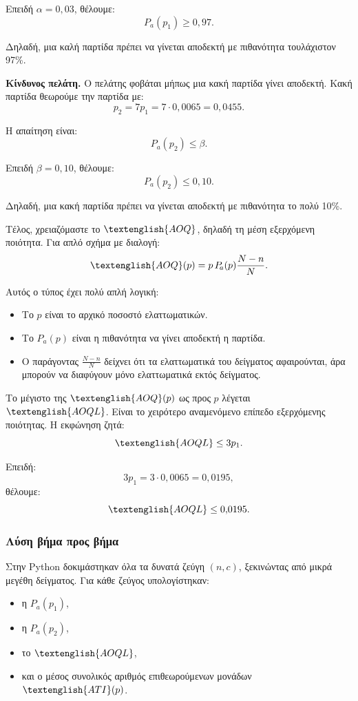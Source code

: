 \documentclass[12pt,a4paper]{article}
\newcommand{\Pa}{P_{\!a}}
\newcommand{\AOQ}{\textenglish{AOQ}}
\newcommand{\AOQL}{\textenglish{AOQL}}
\newcommand{\ATI}{\textenglish{ATI}}
\begin{document}
Επειδή \(\alpha=0{,}03\), θέλουμε:
\[
    \Pa(p_1)\ge 0{,}97.
\]

Δηλαδή, μια καλή παρτίδα πρέπει να γίνεται αποδεκτή με πιθανότητα τουλάχιστον
97\%.

\textbf{Κίνδυνος πελάτη.} Ο πελάτης φοβάται μήπως μια κακή παρτίδα γίνει
αποδεκτή. Κακή παρτίδα θεωρούμε την παρτίδα με:
\[
    p_2=7p_1=7\cdot 0{,}0065=0{,}0455.
\]

Η απαίτηση είναι:
\[
    \Pa(p_2)\le \beta.
\]

Επειδή \(\beta=0{,}10\), θέλουμε:
\[
    \Pa(p_2)\le 0{,}10.
\]

Δηλαδή, μια κακή παρτίδα πρέπει να γίνεται αποδεκτή με πιθανότητα το πολύ
10\%.

Τέλος, χρειαζόμαστε το \(\AOQ\), δηλαδή τη μέση εξερχόμενη ποιότητα. Για
απλό σχήμα με διαλογή:
\[
    \AOQ(p)=p\,\Pa(p)\frac{N-n}{N}.
\]

Αυτός ο τύπος έχει πολύ απλή λογική:

\begin{itemize}
    \item Το \(p\) είναι το αρχικό ποσοστό ελαττωματικών.
    \item Το \(\Pa(p)\) είναι η πιθανότητα να γίνει αποδεκτή η παρτίδα.
    \item Ο παράγοντας \(\frac{N-n}{N}\) δείχνει ότι τα ελαττωματικά του
    δείγματος αφαιρούνται, άρα μπορούν να διαφύγουν μόνο ελαττωματικά εκτός
    δείγματος.
\end{itemize}

Το μέγιστο της \(\AOQ(p)\) ως προς \(p\) λέγεται \(\AOQL\). Είναι το χειρότερο
αναμενόμενο επίπεδο εξερχόμενης ποιότητας. Η εκφώνηση ζητά:
\[
    \AOQL\le 3p_1.
\]

Επειδή:
\[
    3p_1=3\cdot 0{,}0065=0{,}0195,
\]
θέλουμε:
\[
    \AOQL\le 0{,}0195.
\]

\subsubsection*{Λύση βήμα προς βήμα}

Στην Python δοκιμάστηκαν όλα τα δυνατά ζεύγη \((n,c)\), ξεκινώντας από μικρά
μεγέθη δείγματος. Για κάθε ζεύγος υπολογίστηκαν:

\begin{itemize}
    \item η \(\Pa(p_1)\),
    \item η \(\Pa(p_2)\),
    \item το \(\AOQL\),
    \item και ο μέσος συνολικός αριθμός επιθεωρούμενων μονάδων \(\ATI(p)\).
\end{itemize}
\end{document}
